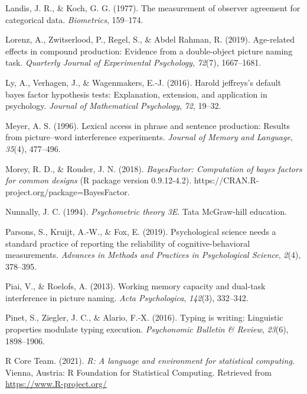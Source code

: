 \documentclass[
  man,floatsintext]{apa6}
\newlength{\cslhangindent}
\newlength{\cslentryspacingunit} %
\newenvironment{CSLReferences}[2] %
 {%
  \setlength{\parindent}{0pt}
  \ifodd #1
  \let\oldpar\par
  \def\par{\hangindent=\cslhangindent\oldpar}
  \fi
  \setlength{\parskip}{#2\cslentryspacingunit}
 }%
 {}
\begin{document}
\begin{CSLReferences}{1}{0}
\leavevmode{}%
Landis, J. R., \& Koch, G. G. (1977). The measurement of observer agreement for categorical data. \emph{Biometrics}, 159--174.

\leavevmode{}%
Lorenz, A., Zwitserlood, P., Regel, S., \& Abdel Rahman, R. (2019). Age-related effects in compound production: Evidence from a double-object picture naming task. \emph{Quarterly Journal of Experimental Psychology}, \emph{72}(7), 1667--1681.

\leavevmode{}%
Ly, A., Verhagen, J., \& Wagenmakers, E.-J. (2016). Harold jeffreys's default bayes factor hypothesis tests: Explanation, extension, and application in psychology. \emph{Journal of Mathematical Psychology}, \emph{72}, 19--32.

\leavevmode{}%
Meyer, A. S. (1996). Lexical access in phrase and sentence production: Results from picture--word interference experiments. \emph{Journal of Memory and Language}, \emph{35}(4), 477--496.

\leavevmode{}%
Morey, R. D., \& Rouder, J. N. (2018). \emph{BayesFactor: Computation of bayes factors for common designs} (R package version 0.9.12-4.2). https://CRAN.R-project.org/package=BayesFactor.

\leavevmode{}%
Nunnally, J. C. (1994). \emph{Psychometric theory 3E}. Tata McGraw-hill education.

\leavevmode{}%
Parsons, S., Kruijt, A.-W., \& Fox, E. (2019). Psychological science needs a standard practice of reporting the reliability of cognitive-behavioral measurements. \emph{Advances in Methods and Practices in Psychological Science}, \emph{2}(4), 378--395.

\leavevmode{}%
Piai, V., \& Roelofs, A. (2013). Working memory capacity and dual-task interference in picture naming. \emph{Acta Psychologica}, \emph{142}(3), 332--342.

\leavevmode{}%
Pinet, S., Ziegler, J. C., \& Alario, F.-X. (2016). Typing is writing: Linguistic properties modulate typing execution. \emph{Psychonomic Bulletin \& Review}, \emph{23}(6), 1898--1906.

\leavevmode{}%
R Core Team. (2021). \emph{R: A language and environment for statistical computing}. Vienna, Austria: R Foundation for Statistical Computing. Retrieved from \url{https://www.R-project.org/}


\end{CSLReferences}
\end{document}
